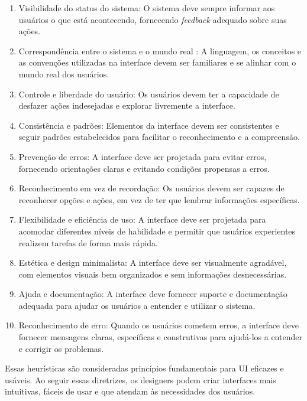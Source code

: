 \begin{enumerate}
    \item Visibilidade do status do sistema: O sistema deve sempre informar aos usuários o que está acontecendo, fornecendo \textit{feedback} adequado sobre suas ações.
    \item Correspondência entre o sistema e o mundo real : A linguagem, os conceitos e as convenções utilizadas na interface devem ser familiares e se alinhar com o mundo real dos usuários.
    \item Controle e liberdade do usuário: Os usuários devem ter a capacidade de desfazer ações indesejadas e explorar livremente a interface.
    \item Consistência e padrões: Elementos da interface devem ser consistentes e seguir padrões estabelecidos para facilitar o reconhecimento e a compreensão.
    \item Prevenção de erros: A interface deve ser projetada para evitar erros, fornecendo orientações claras e evitando condições propensas a erros.
    \item Reconhecimento em vez de recordação: Os usuários devem ser capazes de reconhecer opções e ações, em vez de ter que lembrar informações específicas.
    \item Flexibilidade e eficiência de uso: A interface deve ser projetada para acomodar diferentes níveis de habilidade e permitir que usuários experientes realizem tarefas de forma mais rápida.
    \item Estética e design minimalista: A interface deve ser visualmente agradável, com elementos visuais bem organizados e sem informações desnecessárias.
    \item Ajuda e documentação: A interface deve fornecer suporte e documentação adequada para ajudar os usuários a entender e utilizar o sistema.
    \item Reconhecimento de erro: Quando os usuários cometem erros, a interface deve fornecer mensagens claras, específicas e construtivas para ajudá-los a entender e corrigir os problemas.

\end{enumerate}

Essas heurísticas são consideradas princípios fundamentais para \gls{UI} eficazes e usáveis. Ao seguir essas diretrizes, os designers podem criar interfaces mais intuitivas, fáceis de usar e que atendam às necessidades dos usuários.